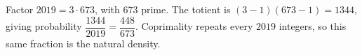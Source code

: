 Factor $2019=3\cdot673$, with $673$ prime. The totient is $(3-1)(673-1)=1344$, giving probability $\dfrac{1344}{2019}=\boxed{\dfrac{448}{673}}$. Coprimality repeats every $2019$ integers, so this same fraction is the natural density.
